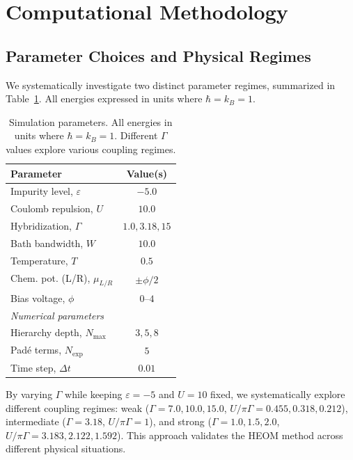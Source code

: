 \documentclass[preprint,1p]{elsarticle}
\begin{document}
\section{Computational Methodology}
\label{sec:methodology}

\subsection{Parameter Choices and Physical Regimes}

We systematically investigate two distinct parameter regimes, summarized in Table~\ref{tab:parameters}. All energies expressed in units where $\hbar = k_B = 1$.

\begin{table}[!htb]
\centering
\caption{Simulation parameters. All energies in units where $\hbar = k_B = 1$. Different $\Gamma$ values explore various coupling regimes.}
\label{tab:parameters}
\footnotesize
\begin{tabular}{@{}lc@{}}
\toprule
\textbf{Parameter} & \textbf{Value(s)} \\
\midrule
Impurity level, $\varepsilon$ & $-5.0$ \\
Coulomb repulsion, $U$ & $10.0$ \\
Hybridization, $\Gamma$ & $1.0, 3.18, 15$ \\
Bath bandwidth, $W$ & $10.0$ \\
Temperature, $T$ & $0.5$ \\
Chem. pot. (L/R), $\mu_{L/R}$ & $\pm\phi/2$ \\
Bias voltage, $\phi$ & $0$--$4$ \\
\midrule
\multicolumn{2}{l}{\textit{Numerical parameters}} \\
\midrule
Hierarchy depth, $N_{\text{max}}$ & $3, 5, 8$ \\
Padé terms, $N_{\text{exp}}$ & $5$ \\
Time step, $\Delta t$ & $0.01$ \\
\bottomrule
\end{tabular}
\end{table}

By varying $\Gamma$ while keeping $\varepsilon = -5$ and $U = 10$ fixed, we systematically explore different coupling regimes: weak ($\Gamma = 7.0, 10.0, 15.0$, $U/ \pi \Gamma = 0.455, 0.318, 0.212$), intermediate ($\Gamma = 3.18$, $U/ \pi \Gamma = 1$), and strong ($\Gamma = 1.0, 1.5,2.0$, $U/ \pi \Gamma = 3.183, 2.122, 1.592$). This approach validates the HEOM method across different physical situations.
\end{document}
